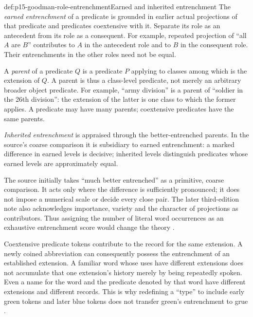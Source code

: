 \begin{hbdefinition}{def:p15-goodman-role-entrenchment}{Earned and inherited entrenchment}
The \emph{earned entrenchment} of a predicate is grounded in earlier actual
projections of that predicate and predicates coextensive with it.
Separate its role as an antecedent from its role as a consequent.
For example, repeated projection of ``all $A$ are $B$'' contributes to
$A$ in the antecedent role and to $B$ in the consequent role. Their
entrenchments in the other roles need not be equal.

A \emph{parent} of a predicate $Q$ is a predicate $P$ applying to classes
among which is the extension of $Q$. A parent is thus a class-level
predicate, not merely an arbitrary broader object predicate. For example,
``army division'' is a parent of ``soldier in the 26th division'': the
extension of the latter is one class to which the former applies.
A predicate may have many parents; coextensive predicates have the same
parents.

\emph{Inherited entrenchment} is appraised through the better-entrenched
parents. In the source's coarse comparison it is subsidiary to earned
entrenchment: a marked difference in earned levels is decisive; inherited
levels distinguish predicates whose earned levels are approximately equal.
\end{hbdefinition}

The source initially takes ``much better entrenched'' as a primitive,
coarse comparison. It acts only where the difference is sufficiently
pronounced; it does not impose a numerical scale or decide every close
pair. The later third-edition note also acknowledges importance, variety
and the character of projections as contributors. Thus assigning the
number of literal word occurrences as an exhaustive entrenchment score
would change the theory \parencite[pp.~94--98, 106--107; p.~104 n.~16; p.~xxii]{Goodman1983FourthProjection}.

Coextensive predicate tokens contribute to the record for the same
extension. A newly coined abbreviation can consequently possess the
entrenchment of an established extension. A familiar word whose uses have
different extensions does not accumulate that one extension's history
merely by being repeatedly spoken. Even a name for the word and the
predicate denoted by that word have different extensions and different
records. This is why redefining a ``type'' to include early green tokens
and later blue tokens does not transfer green's entrenchment to grue
\parencite[pp.~94--96, nn.~6--7]{Goodman1983FourthProjection}.

